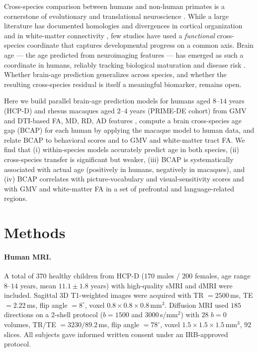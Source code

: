 \documentclass[11pt]{article}
\begin{document}
Cross-species comparison between humans and non-human primates is a cornerstone of evolutionary and translational neuroscience \cite{passingham2002specialization,mars2018comparing,neubertcerebellum2015,schoenemann2006prefrontal,rakic2009evolution,hill2010similar}. While a large literature has documented homologies and divergences in cortical organization \cite{glasser2016multimodal,jiang2013atlas,fan2016brainnetome,semir2016markov} and in white-matter connectivity \cite{mars2018comparing,tobyne2018nonhuman}, few studies have used a \emph{functional} cross-species coordinate that captures developmental progress on a common axis. Brain age --- the age predicted from neuroimaging features --- has emerged as such a coordinate in humans, reliably tracking biological maturation and disease risk \cite{franke2010estimating,cole2017brainage,cole2017brainage2,liem2017predicting}. Whether brain-age prediction generalizes across species, and whether the resulting cross-species residual is itself a meaningful biomarker, remains open.

Here we build parallel brain-age prediction models for humans aged $8$--$14$ years (HCP-D) \cite{hcpd2018,iscohcp} and rhesus macaques aged $2$--$4$ years (PRIME-DE cohort) \cite{milham2018prime} from GMV \cite{ashburner2005vbm} and DTI-based FA, MD, RD, AD features \cite{basser1994dti}, compute a brain cross-species age gap (BCAP) for each human by applying the macaque model to human data, and relate BCAP to behavioral scores and to GMV and white-matter tract FA. We find that (i) within-species models accurately predict age in both species, (ii) cross-species transfer is significant but weaker, (iii) BCAP is systematically associated with actual age (positively in humans, negatively in macaques), and (iv) BCAP correlates with picture-vocabulary and visual-sensitivity scores and with GMV and white-matter FA in a set of prefrontal and language-related regions.

\section{Methods}

\paragraph{Human MRI.} A total of $370$ healthy children from HCP-D ($170$ males / $200$ females, age range $8$--$14$ years, mean $11.1 \pm 1.8$ years) with high-quality sMRI and dMRI were included. Sagittal 3D T1-weighted images were acquired with TR $= 2500$\,ms, TE $= 2.22$\,ms, flip angle $= 8^\circ$, voxel $0.8 \times 0.8 \times 0.8$\,mm$^3$. Diffusion MRI used $185$ directions on a 2-shell protocol ($b = 1500$ and $3000$\,s/mm$^2$) with $28$ $b = 0$ volumes, TR/TE $= 3230/89.2$\,ms, flip angle $= 78^\circ$, voxel $1.5 \times 1.5 \times 1.5$\,mm$^3$, $92$ slices. All subjects gave informed written consent under an IRB-approved protocol.
\end{document}
